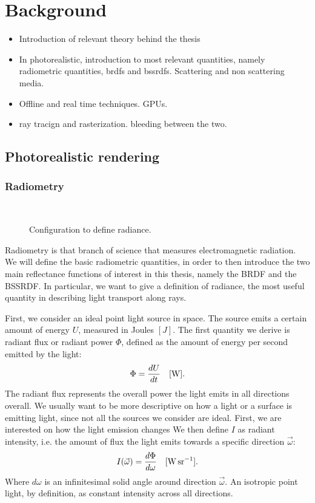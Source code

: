 

\chapter{Background}
\label{sec:background}
\begin{itemize}
\item Introduction of relevant theory behind the thesis
\item In photorealistic, introduction to most relevant quantities, namely radiometric quantities, brdfs and bssrdfs. Scattering and non scattering media.
\item Offline and real time techniques. GPUs. 
\item ray tracign and rasterization. bleeding between the two.
\end{itemize}

\section{Photorealistic rendering}

\subsection{Radiometry}
\begin{figure}
\centering
   \def\svgwidth{0.4\textwidth}
    \\
\caption{Configuration to define radiance.} %
\label{fig:radiance}
\end{figure}
Radiometry is that branch of science that measures electromagnetic radiation. We will define the basic radiometric quantities, in order to then introduce the two main reflectance functions of interest in this thesis, namely the BRDF and the BSSRDF. In particular, we want to give a definition of radiance, the most useful quantity in describing light transport along rays.

First, we consider an ideal point light source in space. The source emits a certain amount of energy $U$, measured in Joules $[J]$. The first quantity we derive is radiant flux or radiant power $\Phi$, defined as the amount of energy per second emitted by the light:
$$
\Phi = \frac{d U}{d t}  \ \ \ [\SI{}{\watt}].
$$
The radiant flux represents the overall power the light emits in all directions overall. We usually want to be more descriptive on how a light or a surface is emitting light, since not all the sources we consider are ideal. First, we are interested on how the light emission changes  We then define $I$ as radiant intensity, i.e. the amount of flux the light emits towards a specific direction $\vec{\omega}$:
$$
I(\vec{\omega}) = \frac{d \Phi}{d \omega}  \siunit{\watt \per \steradian}.
$$   
Where $d \omega$ is an infinitesimal solid angle around direction $\vec{\omega}$. An isotropic point light, by definition, as constant intensity across all directions.

